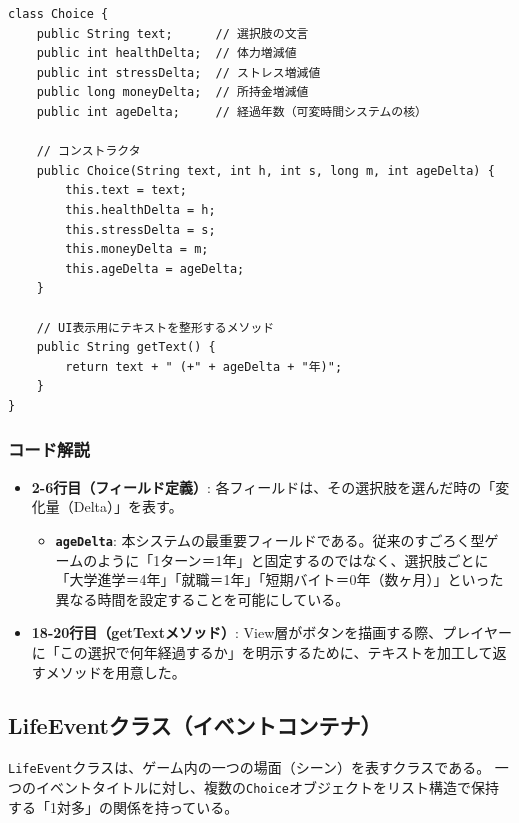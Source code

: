 \documentclass[a4paper,11pt]{jsarticle}
\begin{document}
\begin{lstlisting}[caption=Choice.java, label=code:choice]
class Choice {
    public String text;      // 選択肢の文言
    public int healthDelta;  // 体力増減値
    public int stressDelta;  // ストレス増減値
    public long moneyDelta;  // 所持金増減値
    public int ageDelta;     // 経過年数（可変時間システムの核）

    // コンストラクタ
    public Choice(String text, int h, int s, long m, int ageDelta) {
        this.text = text;
        this.healthDelta = h;
        this.stressDelta = s;
        this.moneyDelta = m;
        this.ageDelta = ageDelta;
    }
    
    // UI表示用にテキストを整形するメソッド
    public String getText() {
        return text + " (+" + ageDelta + "年)";
    }
}
\end{lstlisting}

\subsubsection*{コード解説}
\begin{itemize}
    \item \textbf{2-6行目（フィールド定義）}: 各フィールドは、その選択肢を選んだ時の「変化量（Delta）」を表す。
    \begin{itemize}
        \item \textbf{\texttt{ageDelta}}: 本システムの最重要フィールドである。従来のすごろく型ゲームのように「1ターン＝1年」と固定するのではなく、選択肢ごとに「大学進学＝4年」「就職＝1年」「短期バイト＝0年（数ヶ月）」といった異なる時間を設定することを可能にしている。
    \end{itemize}
    \item \textbf{18-20行目（getTextメソッド）}: View層がボタンを描画する際、プレイヤーに「この選択で何年経過するか」を明示するために、テキストを加工して返すメソッドを用意した。
\end{itemize}

\subsection{LifeEventクラス（イベントコンテナ）}
\texttt{LifeEvent}クラスは、ゲーム内の一つの場面（シーン）を表すクラスである。
一つのイベントタイトルに対し、複数の\texttt{Choice}オブジェクトをリスト構造で保持する「1対多」の関係を持っている。
\end{document}
